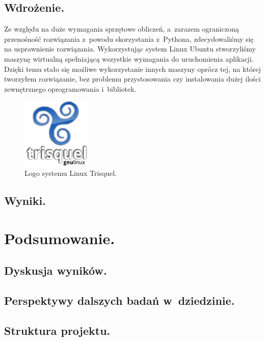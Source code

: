 \documentclass[twoside,12pt]{report}
\let\oldsection\chapter
\def\chapter{\cleardoublepage\oldsection}
\begin{document}
\section{Wdrożenie.}

Ze względu na duże wymagania sprzętowe obliczeń, a~zarazem ograniczoną przenośność rozwiązania z~powodu skorzystania z~Pythona, zdecydowaliśmy się na usprawnienie rozwiązania. Wykorzystując system Linux Ubuntu stworzyliśmy maszynę wirtualną spełniającą wszystkie wymagania do uruchomienia aplikacji. Dzięki temu stało się możliwe wykorzystanie innych maszyny oprócz tej, na której tworzyłem rozwiązanie, bez problemu przystosowania czy instalowania dużej ilości zewnętrznego oprogramowania i~bibliotek\cite{trisquel}.

\begin{figure}[ht]
\centering
\includegraphics[width=0.3\textwidth]{img/trisquel}
\caption{Logo systemu Linux Trisquel.}
\end{figure}

\section{Wyniki.}


\chapter{Podsumowanie.}\label{rozdz.podsumowanie} 
\section{Dyskusja wyników.}

\section{Perspektywy dalszych badań w~dziedzinie.}


\section{Struktura projektu.}
\end{document}
